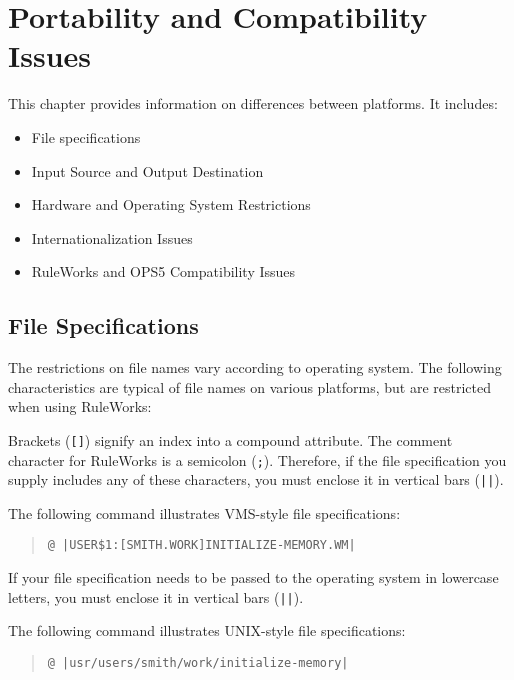 \chapter{Portability and Compatibility Issues}
\label{c:portability}

This chapter provides information on differences between platforms. It
includes:
\begin{itemize}
\item File specifications
\item Input Source and Output Destination
\item Hardware and Operating System Restrictions
\item Internationalization Issues 
\item RuleWorks and OPS5 Compatibility Issues
\end{itemize}

\section{File Specifications}
\label{c:portability:file}

The restrictions on file names vary according to operating system. The
following characteristics are typical of file names on various
platforms, but are restricted when using RuleWorks:

Brackets (\verb|[]|) signify an index into a compound attribute. The
comment character for RuleWorks is a semicolon (\verb|;|). Therefore,
if the file specification you supply includes any of these characters,
you must enclose it in vertical bars (\verb,||,).

The following command illustrates VMS-style file specifications:
\begin{quote}
\begin{verbatim}
@ |USER$1:[SMITH.WORK]INITIALIZE-MEMORY.WM|
\end{verbatim}
\end{quote}

If your file specification needs to be passed to the operating system
in lowercase letters, you must enclose it in vertical bars (\verb,||,).

The following command illustrates UNIX-style file specifications:

\begin{quote}
\begin{verbatim}
@ |usr/users/smith/work/initialize-memory|
\end{verbatim}
\end{quote}

